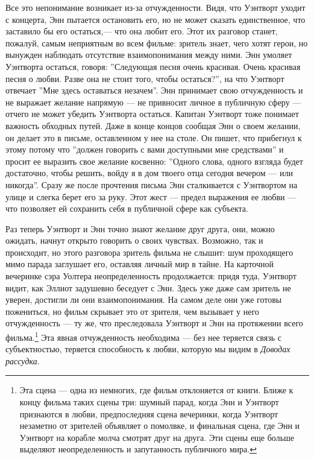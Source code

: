 \documentclass[12pt]{book}
\begin{document}
Все это непонимание возникает из-за отчужденности. Видя, что Уэнтворт уходит с концерта, Энн пытается остановить его, но не может сказать единственное, что заставило бы его остаться,--- что она любит его. Этот их разговор станет, пожалуй, самым неприятным во всем фильме: зритель знает, чего хотят герои, но вынужден наблюдать отсутствие взаимопонимания между ними. Энн умоляет Уэнтворта остаться, говоря: ''Следующая песня очень красивая. Очень красивая песня о любви. Разве она не стоит того, чтобы остаться?'', на что Уэнтворт отвечает ''Мне здесь оставаться незачем''. Энн принимает свою отчужденность и не выражает желание напрямую --- не привносит личное в публичную сферу --- отчего не может убедить Уэнтворта остаться.
Капитан Уэнтворт тоже понимает важность обходных путей. Даже в конце концов сообщая Энн о своем желании, он делает это в письме, оставленном у нее на столе. Он пишет, что прибегнул к этому потому что ''должен говорить с вами доступными мне средствами'' и просит ее выразить свое желание косвенно: ''Одного слова, одного взгляда будет достаточно, чтобы решить, войду я в дом твоего отца сегодня вечером --- или никогда''. Сразу же после прочтения письма Энн сталкивается с Уэнтвортом на улице и слегка берет его за руку. Этот жест --- предел выражения ее любви --- что позволяет ей сохранить себя в публичной сфере как субъекта.

Раз теперь Уэнтворт и Энн точно знают желание друг друга, они, можно ожидать, начнут открыто говорить о своих чувствах. Возможно, так и происходит, но этого разговора зритель фильма не слышит: шум проходящего мимо парада заглушает его, оставляя личный мир в тайне. На карточной вечеринке сэра Уолтера неопределенность продолжается: придя туда, Уэнтворт видит, как Эллиот задушевно беседует с Энн. Здесь уже даже сам зритель не уверен, достигли ли они взаимопонимания. На самом деле они уже готовы пожениться, но фильм скрывает это от зрителя, чем вызывает у него отчужденность --- ту же, что преследовала Уэнтворт и Энн на протяжении всего фильма.\footnote{Эта сцена --- одна из немногих, где фильм отклоняется от книги. Ближе к концу фильма таких сцены три: шумный парад, когда Энн и Уэнтворт признаются в любви, предпоследняя сцена вечеринки, когда Уэнтворт незаметно от зрителей объявляет о помолвке, и финальная сцена, где Энн и Уэнтворт на корабле молча смотрят друг на друга. Эти сцены еще больше выделяют неопределенность и запутанность публичного мира.} Эта явная отчужденность необходима --- без нее теряется связь с субъектностью, теряется способность к любви, которую мы видим в \textit{Доводах рассудка}.
\end{document}
